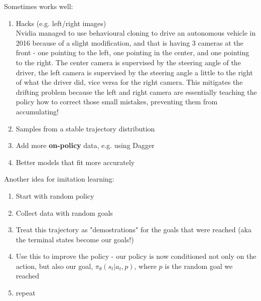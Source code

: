 \documentclass[11pt]{article} %
\begin{document}
Sometimes works well:
\begin{enumerate}
    \item Hacks (e.g. left/right images)\\
    Nvidia managed to use behavioural cloning to drive an autonomous vehicle in 2016 because of a slight modification, and that is having 3 cameras at the front - one pointing to the left, one pointing in the center, and one pointing to the right. The center camera is supervised by the steering angle of the driver, the left camera is supervised by the steering angle a little to the right of what the driver did, vice versa for the right camera. This mitigates the drifting problem because the left and right camera are essentially teaching the policy how to correct those small mistakes, preventing them from accumulating!
    \item Samples from a stable trajectory distribution
    \item Add more \textbf{on-policy} data, e.g. using Dagger
    \item Better models that fit more accurately
\end{enumerate}

Another idea for imitation learning: 
\begin{enumerate}
    \item Start with random policy
    \item Collect data with random goals
    \item Treat this trajectory as "demostrations" for the goals that were reached (aka the terminal states become our goals!)
    \item Use this to improve the policy - our policy is now conditioned not only on the action, but also our goal, $\pi_\theta(s_t | a_t, p)$, where $p$ is the random goal we reached
    \item repeat
\end{enumerate}

\end{document}
